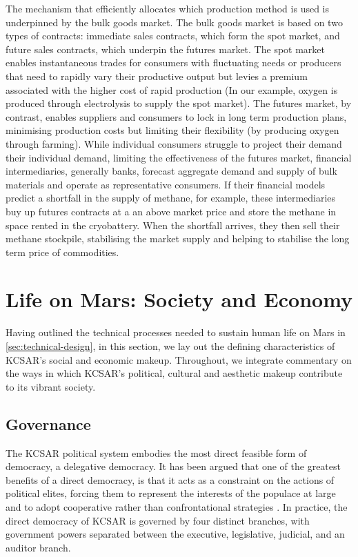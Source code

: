 \documentclass[fleqn,10pt]{Stylesheet} %
\begin{document}
The mechanism that efficiently allocates which production method is used is underpinned by the bulk goods market. The bulk goods market is based on two types of contracts: immediate sales contracts, which form the spot market, and future sales contracts, which underpin the futures market. The spot market enables instantaneous trades for consumers with fluctuating needs or producers that need to rapidly vary their productive output but levies a premium associated with the higher cost of rapid production (In our example, oxygen is produced through electrolysis to supply the spot market). The futures market, by contrast, enables suppliers and consumers to lock in long term production plans, minimising production costs but limiting their flexibility (by producing oxygen through farming). While individual consumers struggle to project their demand their individual demand, limiting the effectiveness of the futures market, financial intermediaries, generally banks, forecast aggregate demand and supply of bulk materials and operate as representative consumers. If their financial models predict a shortfall in the supply of methane, for example, these intermediaries buy up futures contracts at a an above market price and store the methane in space rented in the cryobattery. When the shortfall arrives, they then sell their methane stockpile, stabilising the market supply and helping to stabilise the long term price of commodities.


\section{Life on Mars: Society and Economy}
Having outlined the technical processes needed to sustain human life on Mars in \ref{sec:technical-design}, in this section, we lay out the defining characteristics of KCSAR's social and economic makeup. Throughout, we integrate commentary on the ways in which KCSAR's political, cultural and aesthetic makeup contribute to its vibrant society.

\subsection{Governance}
The KCSAR political system embodies the most direct feasible form of democracy, a delegative democracy. It has been argued that one of the greatest benefits of a direct democracy, is that it acts as a constraint on the actions of political elites, forcing them to represent the interests of the populace at large and to adopt cooperative rather than confrontational strategies \cite{Papadopoulos2001}. In practice, the direct democracy of KCSAR is governed by four distinct branches, with government powers separated between the executive, legislative, judicial, and an auditor branch.
\end{document}
